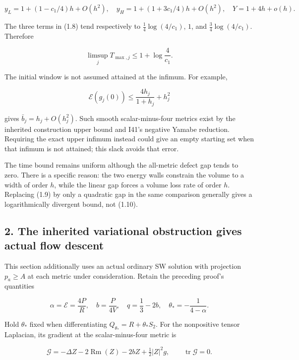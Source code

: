 \documentclass[
  10pt,
]{article}
\begin{document}
\[
 y_L=1+(1-c_1/4)h+O(h^2),\quad
 y_H=1+(1+3c_1/4)h+O(h^2),\quad
 Y=1+4h+o(h).
\]

The three terms in (1.8) tend respectively to \(\frac14\log(4/c_1)\),
\(1\), and \(\frac34\log(4/c_1)\). Therefore

\[
              \boxed{\limsup_j T_{\max,j}
                          \le1+\log\frac4{c_1}.}               \tag{1.10}
\]

The initial window is not assumed attained at the infimum. For example,

\[
 \mathcal E(g_j(0))\le\frac{4h_j}{1+h_j}+h_j^2
\]

gives \(\bar b_j=h_j+O(h_j^2)\). Such smooth scalar-minus-four metrics
exist by the inherited construction upper bound and I41's negative
Yamabe reduction. Requiring the exact upper infimum instead could give
an empty starting set when that infimum is not attained; this slack
avoids that error.

The time bound remains uniform although the all-metric defect gap tends
to zero. There is a specific reason: the two energy walls constrain the
volume to a width of order \(h\), while the linear gap forces a volume
loss rate of order \(h\). Replacing (1.9) by only a quadratic gap in the
same comparison generally gives a logarithmically divergent bound, not
(1.10).

\hypertarget{the-inherited-variational-obstruction-gives-actual-flow-descent}{%
\subsection{2. The inherited variational obstruction gives actual flow
descent}\label{the-inherited-variational-obstruction-gives-actual-flow-descent}}

This section additionally uses an actual ordinary SW solution with
projection \(p_a\ge A\) at each metric under consideration. Retain the
preceding proof's quantities

\[
 \alpha=\mathcal E=\frac{4P}{R},\quad b=\frac P{4V},\quad
 q=\frac13-2b,\quad \theta_*=-\frac1{4-\alpha}.
\]

Hold \(\theta_*\) fixed when differentiating
\(Q_{\theta_*}=R+\theta_*S_2\). For the nonpositive tensor Laplacian,
its gradient at the scalar-minus-four metric is

\[
 \mathcal G=-\Delta Z-2\operatorname{Rm}(Z)-2bZ
                                      +\tfrac12|Z|^2g,
 \qquad \operatorname{tr}\mathcal G=0.               \tag{2.1}
\]
\end{document}
